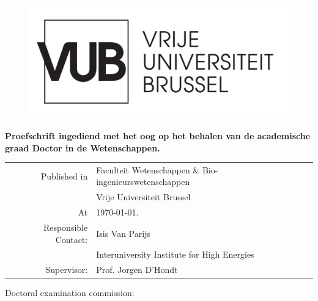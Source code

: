 
\begin{center}
	\vspace*{5mm}
     
    \begin{figure}[ht]
    	\centering
    	\includegraphics[width=0.5\linewidth]{"VUB MONO positief/VUB MONO POSITIEF OUTLINE"}
    	\label{fig:vub-mono-positief-outline}
    \end{figure}
    
	\huge \textbf{\Title}

	\vspace{10mm}

	\Large \Author
	
	\vspace{15mm}
	\large \textbf{Proefschrift ingediend met het oog op het behalen van de academische graad Doctor in de Wetenschappen.}

	\vspace{25mm}
	\small
	\begin{tabular}{rl}
     Published in & Faculteit Wetenschappen \& Bio-ingenieurswetenschappen \\[2mm]
                  &\large Vrije Universiteit Brussel \\[2mm]
               At & \large \today .\\[15mm]
   Responsible Contact: & \large Isis Van Parijs \\[1mm]
                  & Interuniversity Institute for High Energies\\
                  Supervisor: & Prof. Jorgen D'Hondt
	\end{tabular}


\end{center}

\thispagestyle{empty}
\newpage
\null

Doctoral examination commission:\\

